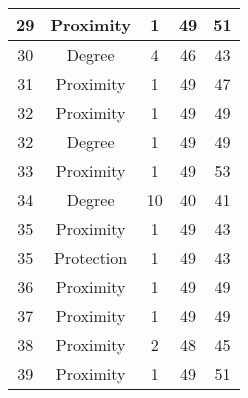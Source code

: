 \documentclass[results.tex]{subfiles}
\begin{document}
\begin{center}
\begin{tabular}{| c || c | c | c | c |}
            \hline
            29                      & Proximity                    & 1                      & 49                      & 51                   \\
            \hline
            30                      & Degree                       & 4                      & 46                      & 43                   \\
            \hline
            31                      & Proximity                    & 1                      & 49                      & 47                   \\
            \hline
            32                      & Proximity                    & 1                      & 49                      & 49                   \\
            \hline
            32                      & Degree                       & 1                      & 49                      & 49                   \\
            \hline
            33                      & Proximity                    & 1                      & 49                      & 53                   \\
            \hline
            34                      & Degree                       & 10                     & 40                      & 41                   \\
            \hline
            35                      & Proximity                    & 1                      & 49                      & 43                   \\
            \hline
            35                      & Protection                   & 1                      & 49                      & 43                   \\
            \hline
            36                      & Proximity                    & 1                      & 49                      & 49                   \\
            \hline
            37                      & Proximity                    & 1                      & 49                      & 49                   \\
            \hline
            38                      & Proximity                    & 2                      & 48                      & 45                   \\
            \hline
            39                      & Proximity                    & 1                      & 49                      & 51                   \\

\end{tabular}
\end{center}
\end{document}
